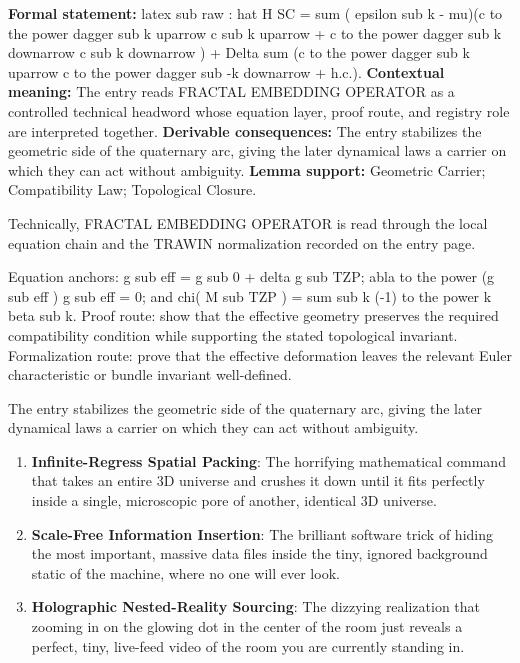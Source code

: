 \begingroup\footnotesize\setlength{\emergencystretch}{3em}\sloppy
\textbf{Formal statement:} latex sub raw : hat H SC = sum ( epsilon sub k - mu)(c to the power dagger sub k uparrow c sub k uparrow + c to the power dagger sub k downarrow c sub k downarrow ) + Delta sum (c to the power dagger sub k uparrow c to the power dagger sub -k downarrow + h.c.). \textbf{Contextual meaning:} The entry reads FRACTAL EMBEDDING OPERATOR as a controlled technical headword whose equation layer, proof route, and registry role are interpreted together. \textbf{Derivable consequences:} The entry stabilizes the geometric side of the quaternary arc, giving the later dynamical laws a carrier on which they can act without ambiguity. \textbf{Lemma support:} Geometric Carrier; Compatibility Law; Topological Closure.\par
\endgroup

Technically, FRACTAL EMBEDDING OPERATOR is read through the local equation chain and the TRAWIN normalization recorded on the entry page.

Equation anchors: g sub eff = g sub 0 + delta g sub TZP; abla to the power (g sub eff ) g sub eff = 0; and chi( M sub TZP ) = sum sub k (-1) to the power k beta sub k. Proof route: show that the effective geometry preserves the required compatibility condition while supporting the stated topological invariant. Formalization route: prove that the effective deformation leaves the relevant Euler characteristic or bundle invariant well-defined.

The entry stabilizes the geometric side of the quaternary arc, giving the later dynamical laws a carrier on which they can act without ambiguity.
\endgroup

\begin{enumerate}[leftmargin=1.6em,itemsep=6pt,topsep=4pt]
\item \textbf{Infinite-Regress Spatial Packing}: The horrifying mathematical command that takes an entire 3D universe and crushes it down until it fits perfectly inside a single, microscopic pore of another, identical 3D universe.
\item \textbf{Scale-Free Information Insertion}: The brilliant software trick of hiding the most important, massive data files inside the tiny, ignored background static of the machine, where no one will ever look.
\item \textbf{Holographic Nested-Reality Sourcing}: The dizzying realization that zooming in on the glowing dot in the center of the room just reveals a perfect, tiny, live-feed video of the room you are currently standing in.
\end{enumerate}

